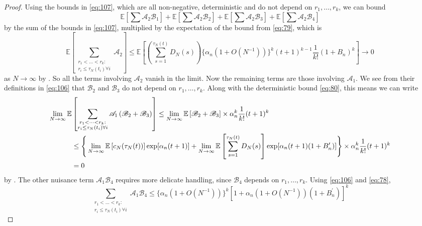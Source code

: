 \documentclass{article}
\newcommand{\E}{\mathbb{E}}
\newcommand{\1}[1]{\mathbbm{1}_{#1}}
\begin{document}
\begin{proof}
Using the bounds in \eqref{eq:107}, which are all non-negative, deterministic and do not depend on $r_1,\dots,r_k$, we can bound
\begin{equation}
\E\left[ \sum \mathscr{A}_2 \mathscr{B}_1 \right] + \E\left[ \sum \mathscr{A}_2 \mathscr{B}_2 \right] + \E\left[ \sum \mathscr{A}_2 \mathscr{B}_3 \right] + \E\left[ \sum \mathscr{A}_2 \mathscr{B}_4 \right]
\end{equation}
by the sum of the bounds in \eqref{eq:107}, multiplied by the expectation of the bound from \eqref{eq:79}, which is
\begin{equation}
\E\left[ \sum_{\substack{r_1 <\dots< r_k :\\ r_i \leq \tau_N(t_i) \forall i}} \mathscr{A}_2 \right]
\leq \E\left[ \left( \sum_{s=1}^{\tau_N(t)} D_N(s) \right) \{ \alpha_n (1+O(N^{-1})) \}^k (t+1)^{k-1} \frac{1}{k!} (1+B_n)^k \right]
\longrightarrow 0
\end{equation}
as $N\to\infty$ by \citet[Equation (3.4)]{brown2021}. 
So all the terms involving $\mathscr{A}_2$ vanish in the limit.
Now the remaining terms are those involving $\mathscr{A}_1$.
We see from their definitions in \eqref{eq:106} that $\mathscr{B}_2$ and $\mathscr{B}_3$ do not depend on $r_1,\dots, r_k$. Along with the deterministic bound \eqref{eq:80}, this means we can write
\begin{align}
\lim_{N\to\infty} \E&\left[ \sum_{\substack{r_1 <\dots< r_k :\\ r_i \leq \tau_N(t_i) \forall i}} \mathscr{A}_1 \left( \mathscr{B}_2 + \mathscr{B}_3 \right) \right]
\leq \lim_{N\to\infty} \E\left[ \mathscr{B}_2 + \mathscr{B}_3 \right] \times
\alpha_n^k \frac{1}{k!} (t+1)^k \notag\\
&\leq \Bigg\{
\lim_{N\to\infty} \E\left[ c_N(\tau_N(t)) \right] \exp[ \alpha_n (t+1) ]
+ \lim_{N\to\infty} \E\left[ \sum_{s=1}^{\tau_N(t)} D_N(s) \right] 
\exp[ \alpha_n (t+1) (1+B_n^\prime) ]
\Bigg\} \times \alpha_n^k \frac{1}{k!} (t+1)^k \notag\\
&=0
\end{align}
by \citet[Equations (3.3)--(3.4)]{brown2021}.
The other nuisance term $\mathscr{A}_1 \mathscr{B}_4$ requires more delicate handling, since $\mathscr{B}_4$ depends on $r_1, \dots, r_k$. Using \eqref{eq:106} and \eqref{eq:78},
\begin{equation}
\sum_{\substack{r_1 <\dots< r_k :\\ r_i \leq \tau_N(t_i) \forall i}} \mathscr{A}_1 \mathscr{B}_4
\leq \{ \alpha_n (1+O(N^{-1})) \}^k
\left[ 1 + \alpha_n (1+O(N^{-1})) (1 + B_n^\prime) \right]^k

\end{equation}
\end{proof}
\end{document}
